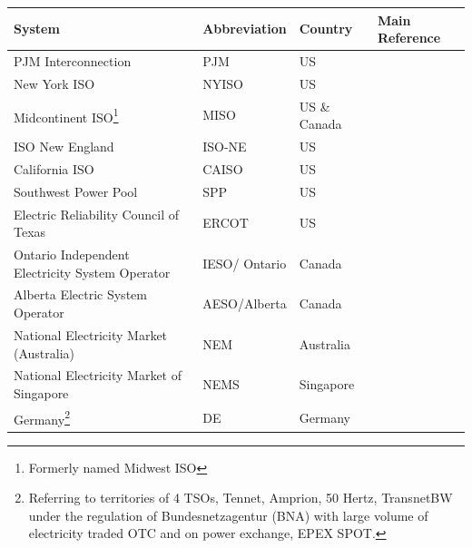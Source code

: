 \begin{table}[h!]
	\small
	\centering
	\begin{tabular}{L{5cm} l l l}
		\hline
		\hline
		\textbf{System} & \textbf{Abbreviation} & \textbf{Country} & \textbf{Main Reference} \\
		\hline
		\hline
		PJM Interconnection & PJM & US & \cite{Rebours2009,Srivastava2011,Cochran2013,EllisonJ.F.TesfatsionL.S.LooseV.W.Byrne2012,Gilstrap2015,Brown2015,Borenstein2015,PJM_web,PJM2017b,PJM2017c}\\
		\hline
		New York ISO & NYISO & US & \cite{Cochran2013,EllisonJ.F.TesfatsionL.S.LooseV.W.Byrne2012,Gilstrap2015,Borenstein2015,NYISO_web}\\
		\hline
		Midcontinent ISO\footnote{Formerly named Midwest ISO}& MISO & US \& Canada& \cite{EllisonJ.F.TesfatsionL.S.LooseV.W.Byrne2012,Gilstrap2015,Borenstein2015,MISO_web}\\
		\hline
		ISO New England & ISO-NE & US & \cite{EllisonJ.F.TesfatsionL.S.LooseV.W.Byrne2012,Gilstrap2015,Borenstein2015,ISO_NE_web}\\
		\hline
		California ISO & CAISO & US& \cite{Rebours2009,EllisonJ.F.TesfatsionL.S.LooseV.W.Byrne2012,Gilstrap2015,Borenstein2015,CAISO_web}\\
		\hline
		Southwest Power Pool & SPP & US & \cite{EllisonJ.F.TesfatsionL.S.LooseV.W.Byrne2012,Gilstrap2015,Borenstein2015,SPP_web}\\
		\hline
		Electric Reliability Council of Texas & ERCOT & US & \cite{Srivastava2011,EllisonJ.F.TesfatsionL.S.LooseV.W.Byrne2012,Brown2015,Gilstrap2015,Borenstein2015,ERCOT_web}\\
		\hline
		Ontario Independent Electricity System Operator& IESO/ Ontario& Canada & \cite{Cochran2013,Brown2015,Ontario_web}\\
		\hline
		Alberta Electric System Operator & AESO/Alberta & Canada &  \cite{Brown2015,Alberta_web}\\
		\hline
		National Electricity Market (Australia) & NEM & Australia & \cite{Srivastava2011,Brown2015,AEMO2010,AEMO2015a}\\
		\hline
		National Electricity Market of Singapore & NEMS & Singapore & \cite{Brown2015} \\
		\hline
		Germany\footnote{Referring to territories of 4 TSOs, Tennet, Amprion, 50 Hertz, TransnetBW under the regulation of Bundesnetzagentur (BNA) with large volume of electricity traded OTC and on power exchange, EPEX SPOT. } & DE & Germany & \cite{FrontierEconomics2016,Wartsila2014,ConsentecGmbH2014,Deloitte2015} \\

\end{tabular}
\end{table}
